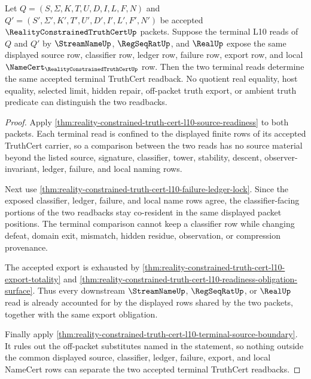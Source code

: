 \begin{theorem}
\label{thm:reality-constrained-truth-cert-l10-terminal-readback-determinacy}
Let $Q=(S,\Sigma,K,T,U,D,I,L,F,N)$ and
$Q'=(S',\Sigma',K',T',U',D',I',L',F',N')$ be accepted
$\RealityConstrainedTruthCertUp$ packets. Suppose the terminal L10 reads of
$Q$ and $Q'$ by $\StreamNameUp$, $\RegSeqRatUp$, and $\RealUp$ expose the same
displayed source row, classifier row, ledger row, failure row, export row, and
local $\NameCert_{\RealityConstrainedTruthCertUp}$ row. Then the two terminal
reads determine the same accepted terminal TruthCert readback. No quotient real
equality, host equality, selected limit, hidden repair, off-packet truth
export, or ambient truth predicate can distinguish the two readbacks.
\end{theorem}
\begin{proof}
Apply
\autoref{thm:reality-constrained-truth-cert-l10-source-readiness} to both
packets. Each terminal read is confined to the displayed finite rows of its
accepted TruthCert carrier, so a comparison between the two reads has no
source material beyond the listed source, signature, classifier, tower,
stability, descent, observer-invariant, ledger, failure, and local naming
rows.

Next use
\autoref{thm:reality-constrained-truth-cert-l10-failure-ledger-lock}. Since
the exposed classifier, ledger, failure, and local name rows agree, the
classifier-facing portions of the two readbacks stay co-resident in the same
displayed packet positions. The terminal comparison cannot keep a classifier
row while changing defeat, domain exit, mismatch, hidden residue, observation,
or compression provenance.

The accepted export is exhausted by
\autoref{thm:reality-constrained-truth-cert-l10-export-totality} and
\autoref{thm:reality-constrained-truth-cert-l10-readiness-obligation-surface}.
Thus every downstream $\StreamNameUp$, $\RegSeqRatUp$, or $\RealUp$ read is
already accounted for by the displayed rows shared by the two packets, together
with the same export obligation.

Finally apply
\autoref{thm:reality-constrained-truth-cert-l10-terminal-source-boundary}. It
rules out the off-packet substitutes named in the statement, so nothing outside
the common displayed source, classifier, ledger, failure, export, and local
NameCert rows can separate the two accepted terminal TruthCert readbacks.
\end{proof}
